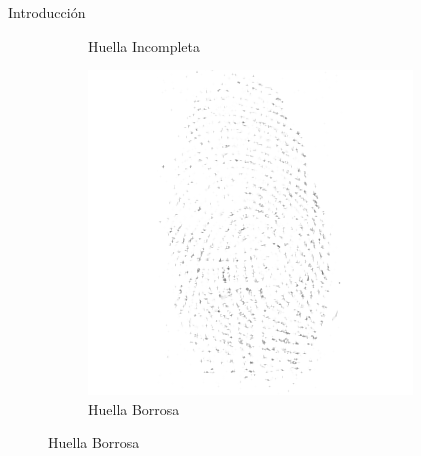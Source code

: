\documentclass[12pt,aspectratio=169]{beamer}
\begin{document}
\begin{frame}{Introducción}
\begin{figure}[h]
\begin{subfigure}{0.23\textwidth}
            \caption{Huella Incompleta}
        \end{subfigure}
        \begin{subfigure}{0.23\textwidth}
            \centering
            \includegraphics[scale=0.3]{figs/deteriorada_0.png}
            \caption{Huella Borrosa}
        \end{subfigure}
    \end{figure}

\end{frame}
\end{document}
